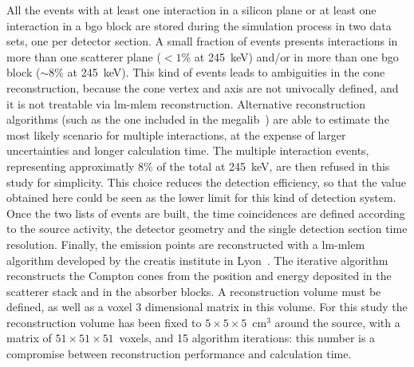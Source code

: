 All the events with at least one interaction in a silicon plane or at least one interaction in a \gls{bgo} block are stored during the simulation process in two data sets, one per detector section. A small fraction of events presents interactions in more than one scatterer plane ($<1$\% at 245~keV) and/or in more than one \gls{bgo} block ($\sim$8\% at 245~keV). This kind of events leads to ambiguities in the cone reconstruction, because the cone vertex and axis are not univocally defined, and it is not treatable via \gls{lm-mlem} reconstruction. Alternative reconstruction algorithms (such as the one included in the \gls{megalib}~\parencite{Zoglauer2006}) are able to estimate the most likely scenario for multiple interactions, at the expense of larger uncertainties and longer calculation time. The multiple interaction events, representing approximatly 8\% of the total at 245~keV, are then refused in this study for simplicity. This choice reduces the detection efficiency, so that the value obtained here could be seen as the lower limit for this kind of detection system. Once the two lists of events are built, the time coincidences are defined according to the source activity, the detector geometry and the single detection section time resolution. Finally, the emission points are reconstructed with a \gls{lm-mlem} algorithm developed by the \gls{creatis} institute in Lyon~\parencite{Lojacono2013}. The iterative algorithm reconstructs the Compton cones from the position and energy deposited in the scatterer stack and in the absorber blocks. A reconstruction volume must be defined, as well as a voxel 3 dimensional matrix in this volume. For this study the reconstruction volume has been fixed to $\mathrm{5\times5\times5}$~$\mathrm{cm^{3}}$ around the source, with a matrix of $\mathrm{51\times51\times51}$~voxels, and 15 algorithm iterations: this number is a compromise between reconstruction performance and calculation time.

